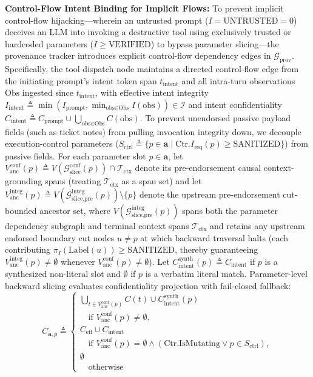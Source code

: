 \documentclass[conference,10pt]{IEEEtran}
\begin{document}
\noindent\textbf{Control-Flow Intent Binding for Implicit Flows:} To prevent implicit control-flow hijacking---wherein an untrusted prompt ($I = \text{UNTRUSTED} = 0$) deceives an LLM into invoking a destructive tool using exclusively trusted or hardcoded parameters ($I \ge \text{VERIFIED}$) to bypass parameter slicing---the provenance tracker introduces explicit control-flow dependency edges in $\mathcal{G}_{\text{prov}}$. Specifically, the tool dispatch node maintains a directed control-flow edge from the initiating prompt's intent token span $t_{\text{intent}}$ and all intra-turn observations $\text{Obs}$ ingested since $t_{\text{intent}}$, with effective intent integrity $I_{\text{intent}} \triangleq \min(I_{\text{prompt}}, \min_{\text{obs} \in \text{Obs}} I(\text{obs})) \in \mathcal{I}$ and intent confidentiality $C_{\text{intent}} \triangleq C_{\text{prompt}} \cup \textstyle\bigcup_{\text{obs} \in \text{Obs}} C(\text{obs})$. To prevent unendorsed passive payload fields (such as ticket notes) from pulling invocation integrity down, we decouple execution-control parameters ($S_{\text{ctrl}} \triangleq \{p \in \mathbf{a} \mid \text{Ctr}.I_{\text{req}}(p) \ge \text{SANITIZED}\}$) from passive fields. For each parameter slot $p \in \mathbf{a}$, let $V_{\text{anc}}^{\text{conf}}(p) \triangleq V(\mathcal{G}_{\text{slice}}^{\text{conf}}(p)) \cap \mathcal{T}_{\text{ctx}}$ denote its pre-endorsement causal context-grounding spans (treating $\mathcal{T}_{\text{ctx}}$ as a span set) and let $V_{\text{anc}}^{\text{integ}}(p) \triangleq V(\mathcal{G}_{\text{slice,pre}}^{\text{integ}}(p)) \setminus \{p\}$ denote the upstream pre-endorsement cut-bounded ancestor set, where $V(\mathcal{G}_{\text{slice,pre}}^{\text{integ}}(p))$ spans both the parameter dependency subgraph and terminal context spans $\mathcal{T}_{\text{ctx}}$ and retains any upstream endorsed boundary cut nodes $u \neq p$ at which backward traversal halts (each contributing $\pi_I(\text{Label}(u)) \ge \text{SANITIZED}$, thereby guaranteeing $V_{\text{anc}}^{\text{integ}}(p) \neq \emptyset$ whenever $V_{\text{anc}}^{\text{conf}}(p) \neq \emptyset$). Let $C_{\text{intent}}^{\text{synth}}(p) \triangleq C_{\text{intent}}$ if $p$ is a synthesized non-literal slot and $\emptyset$ if $p$ is a verbatim literal match. Parameter-level backward slicing evaluates confidentiality projection with fail-closed fallback:
\begin{equation}
\label{eq:param_conf}
C_{\mathbf{a}, p} \triangleq \begin{cases}
\bigcup_{t \in V_{\text{anc}}^{\text{conf}}(p)} C(t) \cup C_{\text{intent}}^{\text{synth}}(p) \\
\quad \text{if } V_{\text{anc}}^{\text{conf}}(p) \ne \emptyset, \\
C_{\text{eff}} \cup C_{\text{intent}} \\
\quad \text{if } V_{\text{anc}}^{\text{conf}}(p) = \emptyset \land (\text{Ctr.IsMutating} \lor p \in S_{\text{ctrl}}), \\
\emptyset \\
\quad \text{otherwise}
\end{cases}
\end{equation}
\end{document}
